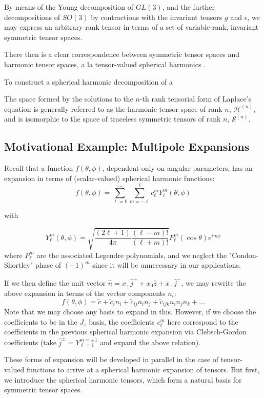 \documentclass[10pt,a4paper]{article}
\begin{document}
By means of the Young decomposition of $GL(3)$, and the further decompositions of $SO(3)$ by contractions with the invariant tensors $g$ and $\epsilon$, we may express an arbitrary rank tensor in terms of a set of variable-rank, invariant symmetric tensor spaces.

There then is a clear correspondence between symmetric tensor spaces and harmonic tensor spaces, a la tensor-valued spherical harmonics \cite{harmonictensors}.

To construct a spherical harmonic decomposition of a




The space formed by the solutions to the $n$-th rank tensorial form of Laplace's equation is generally referred to as the harmonic tensor space of rank $n$, $\mathcal{H}^{(n)}$, and is isomorphic to the space of traceless symmetric tensors of rank $n$, $
\mathcal{S}^{(n)}$.

\subsection{Motivational Example: Multipole Expansions}
Recall that a function $f(\theta,\phi)$, dependent only on angular parameters, has an expansion in terms of (scalar-valued) spherical harmonic functions:
$$
f(\theta,\phi)=\sum_{\ell=0}^{...}\sum_{m=-\ell}^{\ell}c_{\ell}^m Y_{\ell}^m(\theta,\phi)
$$
\begin{center}
with
\end{center}
$$
Y_{\ell}^m(\theta,\phi) = \sqrt{\frac{(2\ell+1)}{4\pi}\frac{(\ell - m)!}{(\ell+m)!}}P_{\ell}^m (\cos \theta)e^{im\phi}
$$
where $P^{m}_{\ell}$ are the associated Legendre polynomials, and we neglect the "Condon-Shortley" phase of $(-1)^m$ since it will be unnecessary in our applications. 

If we then define the unit vector $\hat{n} = x_+\hat{j}^++ x_0 \hat{z} + x_-\hat{j}^-$, we may rewrite the above expansion in terms of the vector components $n_i$:
$$
f(\theta,\phi) = \tilde{c} + \tilde{c}_i n_i + \tilde{c}_{ij}n_in_j + \tilde{c}_{ijk}n_in_jn_k+ ...
$$
Note that we may choose any basis to expand in this. However, if we choose the coefficients to be in the $J_z$ basis, the coefficients $c_{\ell}^m$ here correspond to the coefficients in the previous spherical harmonic expansion via Clebsch-Gordon coefficients (take $\hat{j}^{\pm}=Y_{\ell=1}^{m=\pm 1}$ and expand the above relation). 

These forms of expansion will be developed in parallel in the case of tensor-valued functions to arrive at a spherical harmonic expansion of tensors. But first, we introduce the spherical harmonic tensors, which form a natural basis for symmetric tensor spaces.
\end{document}
